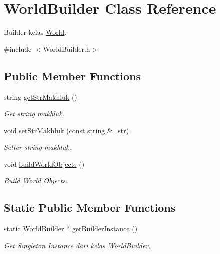 \hypertarget{class_world_builder}{}\section{World\+Builder Class Reference}
\label{class_world_builder}


Builder kelas \hyperlink{class_world}{World}.  




{\ttfamily \#include $<$World\+Builder.\+h$>$}

\subsection*{Public Member Functions}
\begin{DoxyCompactItemize}
\item 
string \hyperlink{class_world_builder_a9fca5be466395c4367aa5d6eb7e2020f}{get\+Str\+Makhluk} ()
\begin{DoxyCompactList}\small\item\em Get string makhluk. \end{DoxyCompactList}\item 
void \hyperlink{class_world_builder_abcb1fda856eebc76d5f5d3a9cf5127f5}{set\+Str\+Makhluk} (const string \&\+\_\+str)
\begin{DoxyCompactList}\small\item\em Setter string makhluk. \end{DoxyCompactList}\item 
void \hyperlink{class_world_builder_ac063d96facdcd9c1c34e69e418d6f733}{build\+World\+Objects} ()
\begin{DoxyCompactList}\small\item\em Build \hyperlink{class_world}{World} Objects. \end{DoxyCompactList}\end{DoxyCompactItemize}
\subsection*{Static Public Member Functions}
\begin{DoxyCompactItemize}
\item 
static \hyperlink{class_world_builder}{World\+Builder} $\ast$ \hyperlink{class_world_builder_ad6b3457a2a185135f33fde9e5939145a}{get\+Builder\+Instance} ()
\begin{DoxyCompactList}\small\item\em Get Singleton Instance dari kelas \hyperlink{class_world_builder}{World\+Builder}. \end{DoxyCompactList}\end{DoxyCompactItemize}


